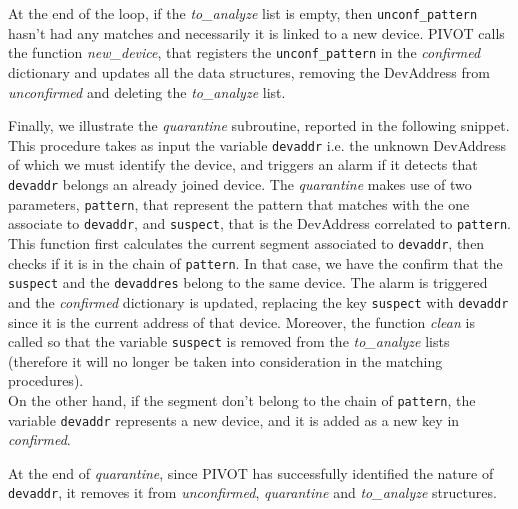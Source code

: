 \vspace{3mm}

\vspace{3mm}

At the end of the loop, if the \textit{to\_analyze} list is empty, then \texttt{unconf\_pattern} hasn't had any matches and necessarily it is linked to a new device. PIVOT calls the function \textit{new\_device}, that registers the \texttt{unconf\_pattern} in the \textit{confirmed} dictionary and updates all the data structures, removing the DevAddress from \textit{unconfirmed} and deleting the \textit{to\_analyze} list.

\vspace{3mm}

\vspace{3mm}

Finally, we illustrate the \textit{quarantine} subroutine, reported in the following snippet. This procedure takes as input the variable \texttt{devaddr} i.e. the unknown DevAddress of which we must identify the device, and triggers an alarm if it detects that \texttt{devaddr} belongs an already joined device. The \textit{quarantine} makes use of two parameters, \texttt{pattern}, that represent the pattern that matches with the one associate to \texttt{devaddr}, and \texttt{suspect}, that is the DevAddress correlated to \texttt{pattern}.
\\
This function first calculates the current segment associated to \texttt{devaddr}, then checks if it is in the chain of \texttt{pattern}. In that case, we have the confirm that the \texttt{suspect} and the \texttt{devaddres} belong to the same device. The alarm is triggered and the \textit{confirmed} dictionary is updated, replacing the key \texttt{suspect} with \texttt{devaddr} since it is the current address of that device. Moreover, the function \textit{clean} is called so that the variable \texttt{suspect} is removed from the \textit{to\_analyze} lists (therefore it will no longer be taken into consideration in the matching procedures).
\\
On the other hand, if the segment don't belong to the chain of \texttt{pattern}, the variable \texttt{devaddr} represents a new device, and it is added as a new key in \textit{confirmed}.

\vspace{3mm}

\vspace{3mm}

At the end of \textit{quarantine}, since PIVOT has successfully identified the nature of \texttt{devaddr}, it removes it from \textit{unconfirmed}, \textit{quarantine} and \textit{to\_analyze} structures.

